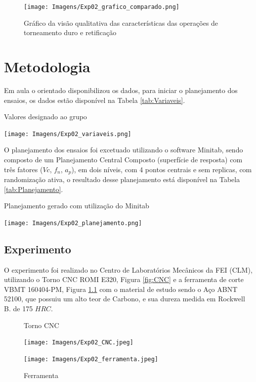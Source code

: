 \documentclass[deposito, acronym, symbols]{fei}
\begin{document}
\begin{figure}[!htb]
    \centering
    \caption{Gráfico da visão qualitativa das características das operações de torneamento duro e retificação}
    \texttt{[image: Imagens/Exp02\_grafico\_comparado.png]}
    \label{fig:Grafico_diferenças}
 \end{figure}

\chapter{Metodologia}

Em aula o orientado disponibilizou os dados, para iniciar o planejamento dos ensaios, os dados estão disponível na Tabela \ref{tab:Variaveis}.

\begin{table}[!htb]
 \centering
    \caption{Valores designado ao grupo}
    \texttt{[image: Imagens/Exp02\_variaveis.png]}
    \label{tab:Variaveis}
 \end{table}

O planejamento dos ensaios foi excetuado utilizando o software Minitab, sendo composto de um Planejamento Central Composto (superfície de resposta) com três fatores ($Vc$, $f_n$, $a_p$), em dois níveis, com 4 pontos centrais e sem replicas, com randomização ativa, o resultado desse planejamento está disponível na Tabela \ref{tab:Planejamento}.

\begin{table}[!htb]
 \centering
    \caption{Planejamento gerado com utilização do Minitab}
    \texttt{[image: Imagens/Exp02\_planejamento.png]}
    \label{tab:Planejamento}
 \end{table}

 \section{Experimento}

 O experimento foi realizado no Centro de Laboratórios Mecânicos da FEI (CLM), utilizando o Torno CNC ROMI E320, Figura \ref{fig:CNC} e a ferramenta de corte VBMT 160404-PM, Figura \ref{fig:Ferramenta} com o material de estudo sendo o Aço ABNT 52100, que possuiu um alto teor de Carbono, e sua dureza medida em Rockwell B. de 175 $HRC$.

\begin{figure}[!htp]
  \centering
  \begin{minipage}{0.4\textwidth}
    \centering
    \caption{Torno CNC}
    \texttt{[image: Imagens/Exp02\_CNC.jpeg]}
    \label{fig:CNC}
  \end{minipage}
  \hfill
  \begin{minipage}{0.4\textwidth}
        \caption{Ferramenta}
    \texttt{[image: Imagens/Exp02\_ferramenta.jpeg]}
    \label{fig:Ferramenta}
  \end{minipage}
\end{figure}
\end{document}
